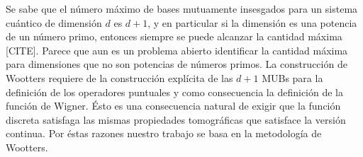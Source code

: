 \documentclass[a4paper]{report}
\DeclareMathOperator{\Z}{\mathbb{Z}}
\begin{document}
  Se sabe que el número máximo de bases mutuamente
  insesgados para un sistema cuántico de dimensión $d$ es
  $d+1$, y en particular si la dimensión es una potencia de
  un número primo, entonces siempre se puede alcanzar la
  cantidad máxima [CITE]. Parece que aun es un problema
  abierto identificar la cantidad máxima para dimensiones
  que no son potencias de números primos. La construcción de
  Wootters requiere de la construcción explícita
  de las $d+1$ MUBs para la definición de los operadores
  puntuales y como consecuencia la definición de la función
  de Wigner. Ésto es una consecuencia natural de
  exigir que la función discreta satisfaga las mismas
  propiedades tomográficas que satisface la versión
  continua. Por éstas razones nuestro trabajo se basa en la
  metodología de Wootters.




\end{document}
